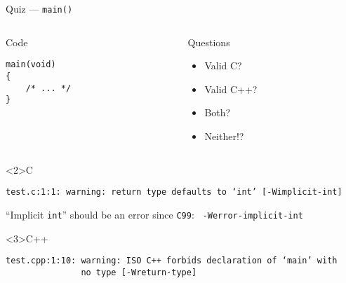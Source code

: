 \documentclass[presentation,aspectratio=169]{beamer}
\begin{document}
\begin{frame}[fragile,label={sec:orgb26de58}]{Quiz — \texttt{main()}}
\begin{columns}
\begin{column}{0.48\columnwidth}
\begin{block}{Code}
\begin{verbatim}
main(void)
{
    /* ... */
}
\end{verbatim}
\end{block}
\end{column}

\begin{column}{0.48\columnwidth}
\begin{block}{Questions}
\begin{itemize}
\item Valid C?
\item Valid C++?
\item Both?
\item Neither!?
\end{itemize}
\end{block}
\end{column}
\end{columns}

\begin{block}<2>{C}
\begin{verbatim}
test.c:1:1: warning: return type defaults to ‘int’ [-Wimplicit-int]
\end{verbatim}
``Implicit \texttt{int}'' should be an error since \texttt{C99}: \texttt{ -Werror-implicit-int}
\end{block}

\vspace{-2cm}

\begin{block}<3>{C++}
\begin{verbatim}
test.cpp:1:10: warning: ISO C++ forbids declaration of ‘main’ with
               no type [-Wreturn-type]
\end{verbatim}
\end{block}
\end{frame}

\end{document}
